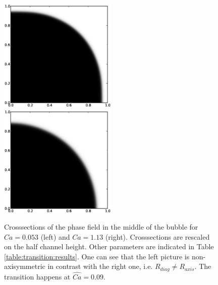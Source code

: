 \documentclass[preprint,12pt]{elsarticle}
\begin{document}
\begin{figure}[ht]
\includegraphics[width=0.5\textwidth]{phase_crossection_ca5.eps}
\includegraphics[width=0.5\textwidth]{phase_crossection_ca13.eps}\\
\caption{Crosssections of the phase field in the middle of the bubble for $Ca=0.053$
(left) and $Ca=1.13$ (right). Crosssections are rescaled on the half channel height. Other
parameters are indicated in Table \ref{table:transition:results}. One can see that the left picture
is non-axisymmetric in contrast
with the right one, i.e. $R_{diag}\neq R_{axis}$. The transition happens at
$\widehat{Ca}=0.09$.\label{fig:crosssections:sym}}
\end{figure}
\end{document}
